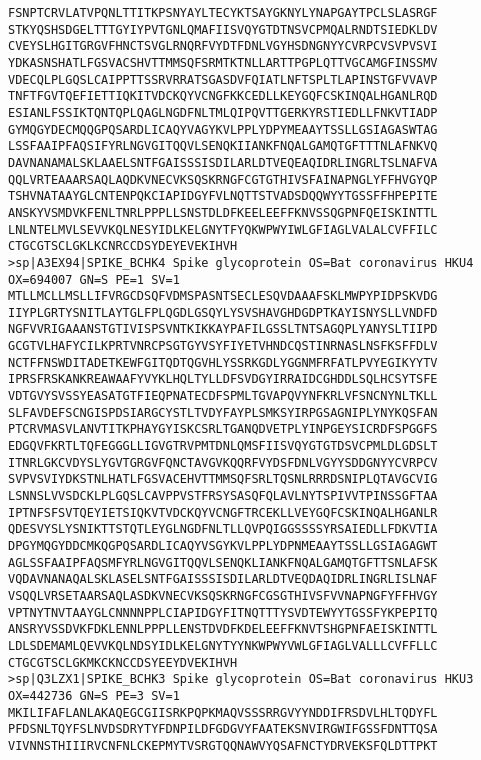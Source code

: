 \documentclass[en,black,12pt,normal]{elegantnote}
\begin{document}
\begin{lstlisting}
FSNPTCRVLATVPQNLTTITKPSNYAYLTECYKTSAYGKNYLYNAPGAYTPCLSLASRGF
STKYQSHSDGELTTTGYIYPVTGNLQMAFIISVQYGTDTNSVCPMQALRNDTSIEDKLDV
CVEYSLHGITGRGVFHNCTSVGLRNQRFVYDTFDNLVGYHSDNGNYYCVRPCVSVPVSVI
YDKASNSHATLFGSVACSHVTTMMSQFSRMTKTNLLARTTPGPLQTTVGCAMGFINSSMV
VDECQLPLGQSLCAIPPTTSSRVRRATSGASDVFQIATLNFTSPLTLAPINSTGFVVAVP
TNFTFGVTQEFIETTIQKITVDCKQYVCNGFKKCEDLLKEYGQFCSKINQALHGANLRQD
ESIANLFSSIKTQNTQPLQAGLNGDFNLTMLQIPQVTTGERKYRSTIEDLLFNKVTIADP
GYMQGYDECMQQGPQSARDLICAQYVAGYKVLPPLYDPYMEAAYTSSLLGSIAGASWTAG
LSSFAAIPFAQSIFYRLNGVGITQQVLSENQKIIANKFNQALGAMQTGFTTTNLAFNKVQ
DAVNANAMALSKLAAELSNTFGAISSSISDILARLDTVEQEAQIDRLINGRLTSLNAFVA
QQLVRTEAAARSAQLAQDKVNECVKSQSKRNGFCGTGTHIVSFAINAPNGLYFFHVGYQP
TSHVNATAAYGLCNTENPQKCIAPIDGYFVLNQTTSTVADSDQQWYYTGSSFFHPEPITE
ANSKYVSMDVKFENLTNRLPPPLLSNSTDLDFKEELEEFFKNVSSQGPNFQEISKINTTL
LNLNTELMVLSEVVKQLNESYIDLKELGNYTFYQKWPWYIWLGFIAGLVALALCVFFILC
CTGCGTSCLGKLKCNRCCDSYDEYEVEKIHVH
>sp|A3EX94|SPIKE_BCHK4 Spike glycoprotein OS=Bat coronavirus HKU4 OX=694007 GN=S PE=1 SV=1
MTLLMCLLMSLLIFVRGCDSQFVDMSPASNTSECLESQVDAAAFSKLMWPYPIDPSKVDG
IIYPLGRTYSNITLAYTGLFPLQGDLGSQYLYSVSHAVGHDGDPTKAYISNYSLLVNDFD
NGFVVRIGAAANSTGTIVISPSVNTKIKKAYPAFILGSSLTNTSAGQPLYANYSLTIIPD
GCGTVLHAFYCILKPRTVNRCPSGTGYVSYFIYETVHNDCQSTINRNASLNSFKSFFDLV
NCTFFNSWDITADETKEWFGITQDTQGVHLYSSRKGDLYGGNMFRFATLPVYEGIKYYTV
IPRSFRSKANKREAWAAFYVYKLHQLTYLLDFSVDGYIRRAIDCGHDDLSQLHCSYTSFE
VDTGVYSVSSYEASATGTFIEQPNATECDFSPMLTGVAPQVYNFKRLVFSNCNYNLTKLL
SLFAVDEFSCNGISPDSIARGCYSTLTVDYFAYPLSMKSYIRPGSAGNIPLYNYKQSFAN
PTCRVMASVLANVTITKPHAYGYISKCSRLTGANQDVETPLYINPGEYSICRDFSPGGFS
EDGQVFKRTLTQFEGGGLLIGVGTRVPMTDNLQMSFIISVQYGTGTDSVCPMLDLGDSLT
ITNRLGKCVDYSLYGVTGRGVFQNCTAVGVKQQRFVYDSFDNLVGYYSDDGNYYCVRPCV
SVPVSVIYDKSTNLHATLFGSVACEHVTTMMSQFSRLTQSNLRRRDSNIPLQTAVGCVIG
LSNNSLVVSDCKLPLGQSLCAVPPVSTFRSYSASQFQLAVLNYTSPIVVTPINSSGFTAA
IPTNFSFSVTQEYIETSIQKVTVDCKQYVCNGFTRCEKLLVEYGQFCSKINQALHGANLR
QDESVYSLYSNIKTTSTQTLEYGLNGDFNLTLLQVPQIGGSSSSYRSAIEDLLFDKVTIA
DPGYMQGYDDCMKQGPQSARDLICAQYVSGYKVLPPLYDPNMEAAYTSSLLGSIAGAGWT
AGLSSFAAIPFAQSMFYRLNGVGITQQVLSENQKLIANKFNQALGAMQTGFTTSNLAFSK
VQDAVNANAQALSKLASELSNTFGAISSSISDILARLDTVEQDAQIDRLINGRLISLNAF
VSQQLVRSETAARSAQLASDKVNECVKSQSKRNGFCGSGTHIVSFVVNAPNGFYFFHVGY
VPTNYTNVTAAYGLCNNNNPPLCIAPIDGYFITNQTTTYSVDTEWYYTGSSFYKPEPITQ
ANSRYVSSDVKFDKLENNLPPPLLENSTDVDFKDELEEFFKNVTSHGPNFAEISKINTTL
LDLSDEMAMLQEVVKQLNDSYIDLKELGNYTYYNKWPWYVWLGFIAGLVALLLCVFFLLC
CTGCGTSCLGKMKCKNCCDSYEEYDVEKIHVH
>sp|Q3LZX1|SPIKE_BCHK3 Spike glycoprotein OS=Bat coronavirus HKU3 OX=442736 GN=S PE=3 SV=1
MKILIFAFLANLAKAQEGCGIISRKPQPKMAQVSSSRRGVYYNDDIFRSDVLHLTQDYFL
PFDSNLTQYFSLNVDSDRYTYFDNPILDFGDGVYFAATEKSNVIRGWIFGSSFDNTTQSA
VIVNNSTHIIIRVCNFNLCKEPMYTVSRGTQQNAWVYQSAFNCTYDRVEKSFQLDTTPKT

\end{lstlisting}
\end{document}
